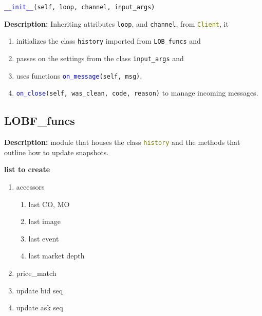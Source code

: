 \textcolor{blue}{\texttt{\_\_init\_\_}}\texttt{(self, loop, channel, input\_args)}
\medskip

\noindent \textbf{Description:} Inheriting attributes \texttt{loop}, and \texttt{channel}, from \textcolor{olive}{\texttt{Client}}, it
\begin{enumerate} 
	\item initializes the class \texttt{history} imported from \texttt{LOB\_funcs} and
	\item passes on the settings from the class \texttt{input\_args} and \item uses functions \textcolor{blue}{\texttt{on\_message}}\texttt{(self, msg)},
	\item \textcolor{blue}{\texttt{on\_close}}\texttt{(self, was\_clean, code, reason)} to manage incoming messages.
\end{enumerate} 


\cleardoublepage

\cleardoublepage

\cleardoublepage


\cleardoublepage


\subsection{LOBF\_funcs}
\hfill \break
\textbf{Description:} module that houses the class \textcolor{olive}{\texttt{history}} and the methods that outline how to update snapshots.




\textbf{list to create}


\begin{enumerate}
	\item accessors\begin{enumerate}
		\item last CO, MO
		\item last image
		\item last event
		\item last market depth
	\end{enumerate}
	\item price\_match 
	\item update bid seq
	\item update ask seq
\end{enumerate}

